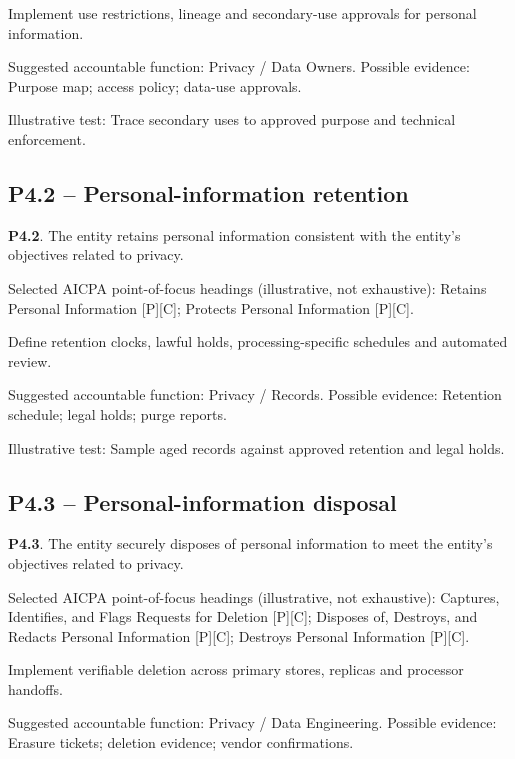 \documentclass[10pt,oneside]{report}
\begin{document}
\begin{engineeringbox}
Implement use restrictions, lineage and secondary-use approvals for personal information.
\end{engineeringbox}
Suggested accountable function: Privacy / Data Owners. Possible evidence: Purpose map; access policy; data-use approvals.

Illustrative test: Trace secondary uses to approved purpose and technical enforcement.

\subsection*{P4.2 -- Personal-information retention}
\begin{aicpabox}
\textbf{P4.2}. The entity retains personal information consistent with the entity's objectives related to privacy.\par{}
\end{aicpabox}
Selected AICPA point-of-focus headings (illustrative, not exhaustive): Retains Personal Information [P][C]; Protects Personal Information [P][C].

\begin{engineeringbox}
Define retention clocks, lawful holds, processing-specific schedules and automated review.
\end{engineeringbox}
Suggested accountable function: Privacy / Records. Possible evidence: Retention schedule; legal holds; purge reports.

Illustrative test: Sample aged records against approved retention and legal holds.

\subsection*{P4.3 -- Personal-information disposal}
\begin{aicpabox}
\textbf{P4.3}. The entity securely disposes of personal information to meet the entity's objectives related to privacy.\par{}
\end{aicpabox}
Selected AICPA point-of-focus headings (illustrative, not exhaustive): Captures, Identifies, and Flags Requests for Deletion [P][C]; Disposes of, Destroys, and Redacts Personal Information [P][C]; Destroys Personal Information [P][C].

\begin{engineeringbox}
Implement verifiable deletion across primary stores, replicas and processor handoffs.
\end{engineeringbox}
Suggested accountable function: Privacy / Data Engineering. Possible evidence: Erasure tickets; deletion evidence; vendor confirmations.
\end{document}
